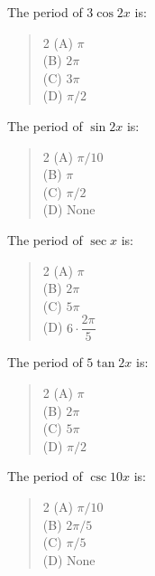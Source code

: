 \documentclass[11pt,a4paper]{article}
\begin{document}
\begin{mcqlist}
\item The period of $3\cos2x$ is:
\begin{quote}\begin{multicols}{2}
\noindent (A) $\pi$ \\
(B) $2\pi$ \\
(C) $3\pi$ \\
(D) $\pi/2$
\end{multicols}\end{quote}

\item The period of $\sin2x$ is:
\begin{quote}\begin{multicols}{2}
\noindent (A) $\pi/10$ \\
(B) $\pi$ \\
(C) $\pi/2$ \\
(D) None
\end{multicols}\end{quote}

\item The period of $\sec x$ is:
\begin{quote}\begin{multicols}{2}
\noindent (A) $\pi$ \\
(B) $2\pi$ \\
(C) $5\pi$ \\
(D) $6\cdot\dfrac{2\pi}{5}$
\end{multicols}\end{quote}

\item The period of $5\tan2x$ is:
\begin{quote}\begin{multicols}{2}
\noindent (A) $\pi$ \\
(B) $2\pi$ \\
(C) $5\pi$ \\
(D) $\pi/2$
\end{multicols}\end{quote}

\item The period of $\csc10x$ is:
\begin{quote}\begin{multicols}{2}
\noindent (A) $\pi/10$ \\
(B) $2\pi/5$ \\
(C) $\pi/5$ \\
(D) None
\end{multicols}\end{quote}


\end{mcqlist}
\end{document}
